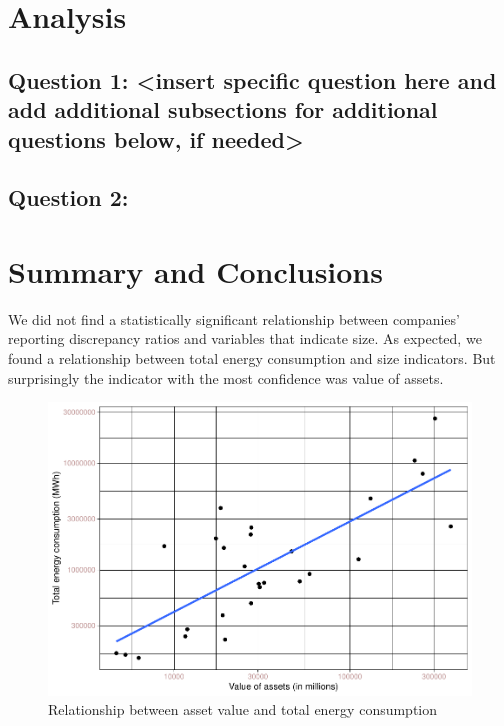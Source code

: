 \documentclass[
  12pt,
]{article}
\begin{document}
\newpage

\hypertarget{analysis}{%
\section{Analysis}\label{analysis}}

\hypertarget{question-1-insert-specific-question-here-and-add-additional-subsections-for-additional-questions-below-if-needed}{%
\subsection{Question 1: \textless insert specific question here and add
additional subsections for additional questions below, if
needed\textgreater{}}\label{question-1-insert-specific-question-here-and-add-additional-subsections-for-additional-questions-below-if-needed}}

\hypertarget{question-2}{%
\subsection{Question 2:}\label{question-2}}

\newpage

\hypertarget{summary-and-conclusions}{%
\section{Summary and Conclusions}\label{summary-and-conclusions}}

We did not find a statistically significant relationship between
companies' reporting discrepancy ratios and variables that indicate
size. As expected, we found a relationship between total energy
consumption and size indicators. But surprisingly the indicator with the
most confidence was value of assets.

\begin{figure}
\centering
\includegraphics{BoothProphete_Report_files/figure-latex/plot1-1.pdf}
\caption{Relationship between asset value and total energy consumption}
\end{figure}
\end{document}
